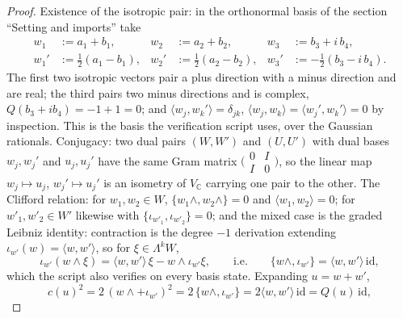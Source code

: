 \documentclass[11pt]{article}
\theoremstyle{definition}
\theoremstyle{plain}
\providecommand{\C}{}\renewcommand{\C}{\mathbb{C}}
\providecommand{\id}{}\renewcommand{\id}{\mathrm{id}}
\providecommand{\ip}{}\renewcommand{\ip}[2]{\langle #1, #2\rangle}
\begin{document}
\begin{proof}
Existence of the isotropic pair: in the orthonormal basis of the section ``Setting and imports'' take
\begin{align*}
w_1 &:= a_1 + b_1, & w_2 &:= a_2 + b_2, & w_3 &:= b_3 + i\,b_4,\\
w_1' &:= \tfrac12(a_1 - b_1), & w_2' &:= \tfrac12(a_2 - b_2), & w_3' &:= -\tfrac12(b_3 - i\,b_4).
\end{align*}
The first two isotropic vectors pair a plus direction with a minus direction and are real; the third pairs two minus directions and is complex, $Q(b_3 + ib_4) = -1 + 1 = 0$; and $\ip{w_j}{w_k'} = \delta_{jk}$, $\ip{w_j}{w_k} = \ip{w_j'}{w_k'} = 0$ by inspection. This is the basis the verification script uses, over the Gaussian rationals. Conjugacy: two dual pairs $(W, W')$ and $(U, U')$ with dual bases $w_j, w_j'$ and $u_j, u_j'$ have the same Gram matrix $\bigl(\begin{smallmatrix} 0 & I \\ I & 0\end{smallmatrix}\bigr)$, so the linear map $w_j \mapsto u_j$, $w_j' \mapsto u_j'$ is an isometry of $V_\C$ carrying one pair to the other. The Clifford relation: for $w_1, w_2 \in W$, $\{w_1\wedge, w_2\wedge\} = 0$ and $\ip{w_1}{w_2} = 0$; for $w'_1, w'_2 \in W'$ likewise with $\{\iota_{w'_1}, \iota_{w'_2}\} = 0$; and the mixed case is the graded Leibniz identity: contraction is the degree $-1$ derivation extending $\iota_{w'}(w) = \ip{w}{w'}$, so for $\xi \in \Lambda^k W$,
\[
\iota_{w'}(w\wedge\xi) = \ip{w}{w'}\,\xi - w\wedge\iota_{w'}\xi, \qquad\text{i.e.}\qquad \{w\wedge, \iota_{w'}\} = \ip{w}{w'}\,\id ,
\]
which the script also verifies on every basis state. Expanding $u = w + w'$,
\[
c(u)^2 = 2\,(w\wedge + \iota_{w'})^2 = 2\,\{w\wedge, \iota_{w'}\} = 2\ip{w}{w'}\,\id = Q(u)\,\id ,
\]

\end{proof}
\end{document}
